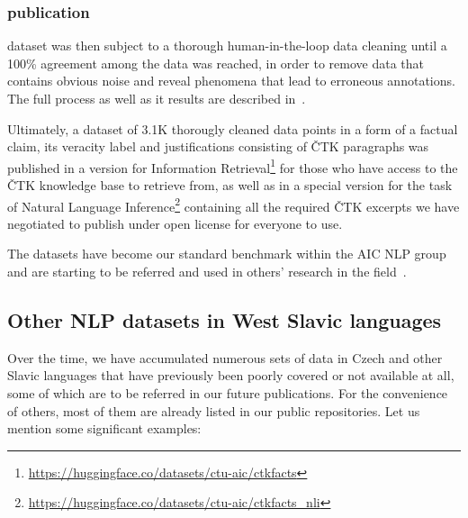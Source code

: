 \subsubsection{\CTK publication}
\CTK dataset was then subject to a thorough human-in-the-loop data cleaning until a 100\% agreement among the data was reached, in order to remove data that contains obvious noise and reveal phenomena that lead to erroneous annotations.
The full process as well as it results are described in~\cite{lrev}.

Ultimately, a dataset of 3.1K thorougly cleaned data points in a form of a factual claim, its veracity label and justifications consisting of ČTK paragraphs was published in a version for Information Retrieval\footnote{\url{https://huggingface.co/datasets/ctu-aic/ctkfacts}} for those who have access to the ČTK knowledge base to retrieve from, as well as in a special version for the task of Natural Language Inference\footnote{\url{https://huggingface.co/datasets/ctu-aic/ctkfacts_nli}} containing all the required ČTK excerpts we have negotiated to publish under open license for everyone to use.

The datasets have become our standard benchmark within the AIC NLP group~\cite{semin,mlynar} and are starting to be referred and used in others' research in the field~\cite{stefanik}.

\subsection{Other NLP datasets in West Slavic languages}
Over the time, we have accumulated numerous sets of data in Czech and other Slavic languages that have previously been poorly covered or not available at all, some of which are to be referred in our future publications.
For the convenience of others, most of them are already listed in our public repositories.
Let us mention some significant examples:

